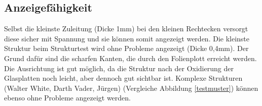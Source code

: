 \subsection{Anzeigefähigkeit}
Selbst die kleinste Zuleitung (Dicke 1mm) bei den kleinen Rechtecken versorgt diese sicher mit Spannung und sie können somit angezeigt werden. Die kleinste Struktur beim Strukturtest wird ohne Probleme angezeigt (Dicke 0,4mm). Der Grund dafür sind die scharfen Kanten, die durch den Folienplott erreicht werden. Die Ausrichtung ist gut möglich, da die Struktur nach der Oxidierung der Glasplatten noch leicht, aber dennoch gut sichtbar ist. Komplexe Strukturen (Walter White, Darth Vader, Jürgen) (Vergleiche Abbildung \ref{testmuster}) können ebenso ohne Probleme angezeigt werden.

\begin{figure}[]
    \centering
    ~
    ~
    ~
\end{figure}
